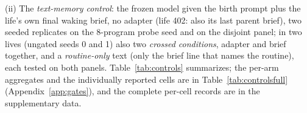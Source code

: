 \documentclass{article}
\begin{document}
(ii) The \emph{text-memory control}: the frozen model given the birth prompt plus the life's own final waking brief, no adapter (life 402: also its last parent brief), two seeded replicates on the 8-program probe seed and on the disjoint panel; in two lives (ungated seeds 0 and 1) also two \emph{crossed conditions}, adapter and brief together, and a \emph{routine-only} text (only the brief line that names the routine), each tested on both panels. Table~\ref{tab:controls} summarizes; the per-arm aggregates and the individually reported cells are in Table~\ref{tab:controlsfull} (Appendix~\ref{app:gates}), and the complete per-cell records are in the supplementary data.

\end{document}
